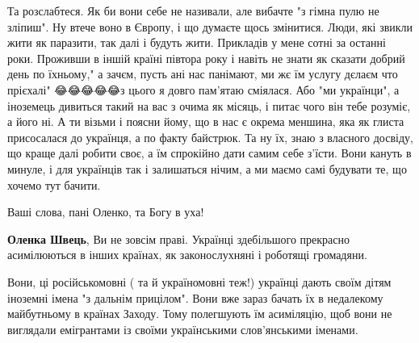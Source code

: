 \begin{itemize}
Та розслабтеся. Як би вони себе не називали, але вибачте "з гімна пулю не
зліпиш". Ну втече воно в Європу, і що думаєте щось змінитися. Люди, які звикли
жити як паразити, так далі і будуть жити. Прикладів у мене сотні за останні
роки. Проживши в іншій країні півтора року і навіть не знати як сказати добрий
день по їхньому," а зачєм, пусть ані нас панімают, ми жє їм услугу дєлаєм что
прієхалі" 😂😂😂😂😂з цього я довго пам'ятаю сміялася. Або "ми українци", а
іноземець дивиться такий на вас з очима як місяць, і питає чого він тебе
розуміє, а його ні. А ти візьми і поясни йому, що в нас є окрема меншина, яка
як глиста присосалася до українця, а по факту байстрюк. Та ну їх, знаю з
власного досвіду, що краще далі робити своє, а їм спрокійно дати самим себе
з'їсти. Вони кануть в минуле, і для українців так і залишаться нічим, а ми
маємо самі будувати те, що хочемо тут бачити.

\begin{itemize}
 
Ваші слова, пані Оленко, та Богу в уха!

 
\textbf{Оленка Швець}, Ви не зовсім праві. Українці здебільшого прекрасно асимілюються в інших країнах, як законослухняні і роботящі громадяни.

 

Вони, ці російськомовні ( та й україномовні теж!) українці дають своїм дітям
іноземні імена "з дальнім прицілом". Вони вже зараз бачать їх в недалекому
майбутньому в країнах Заходу. Тому полегшують їм асиміляцію, щоб вони не
виглядали емігрантами із своїми українськими слов'янськими іменами.


 

\end{itemize}
\end{itemize}
